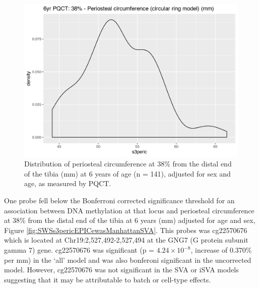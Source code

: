 \documentclass[
]{book}
\begin{document}
\begin{figure}

{\centering \includegraphics[width=0.8\linewidth]{figs/SWSs3peric} 

}

\caption{Distribution of periosteal circumference at 38\% from the distal end of the tibia (mm) at 6 years of age (n = 141), adjusted for sex and age, as measured by PQCT.}\label{fig:SWSs3peric}
\end{figure}



One probe fell below the Bonferroni corrected significance threshold for an association between DNA methylation at that locus and periosteal circumference at 38\% from the distal end of the tibia at 6 years (mm) adjusted for age and sex, Figure \ref{fig:SWSs3pericEPICewasManhattanSVA}. This probes was cg22570676 which is located at Chr19:2,527,492-2,527,494 at the GNG7 (G protein subunit gamma 7) gene. cg22570676 was significant (p = \(4.24\times 10^{-8}\), increase of 0.370\% per mm) in the `all' model and was also bonferoni significant in the uncorrected model. However, cg22570676 was not significant in the SVA or iSVA models suggesting that it may be attributable to batch or cell-type effects.
\end{document}
